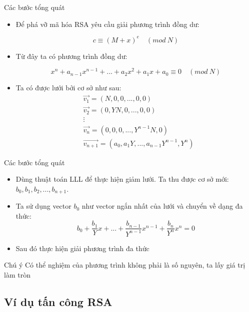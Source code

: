 \begin{frame}{Các bước tổng quát}

\begin{itemize}
\item Để phá vỡ mã hóa RSA yêu cầu giải phương trình đồng dư:

$$c \equiv (M + x)^e \quad (mod \ N)$$
\item Từ đây ta có phương trình đồng dư:

$$x^n + a_{n-1}x^{n-1} + ... + a_2x^2 + a_1x + a_0 \equiv 0 \quad (mod \ N) $$

\item Ta có được lưới bởi cơ sở như sau:
$$
\begin{aligned}
&\Vec{v_1} = (N, 0, 0, ..., 0, 0)\\
&\Vec{v_2} = (0, YN, 0, ..., 0, 0)\\
&\vdots\\
&\Vec{v_n} = (0, 0, 0, ..., Y^{n-1}N, 0)\\
&\Vec{v_{n+1}} = (a_0, a_1Y, ..., a_{n-1}Y^{n-1}, Y^{n})
\end{aligned}
$$

\end{itemize}
\end{frame}
\begin{frame}{Các bước tổng quát}

\begin{itemize}
\item Dùng thuật toán LLL để thực hiện giảm lưới. Ta thu được cơ sở mới: $b_0, b_1, b_2, ..., b_{n+1}$.
\item Ta sử dụng vector $b_0$ như vector ngắn nhất của lưới và chuyển về dạng đa thức:
$$b_0 + \frac{b_1}{Y}x + ... + \frac{b_{n-1}}{Y^{n-1}}x^{n-1} + \frac{b_n}{Y^n}x^n = 0$$
\item Sau đó thực hiện giải phương trình đa thức
\end{itemize}

\begin{block}{Chú ý}
Có thể nghiệm của   phương trình  không phải là số nguyên, ta lấy giá trị làm tròn
\end{block}

\end{frame}
\subsection{Ví dụ tấn công RSA}

